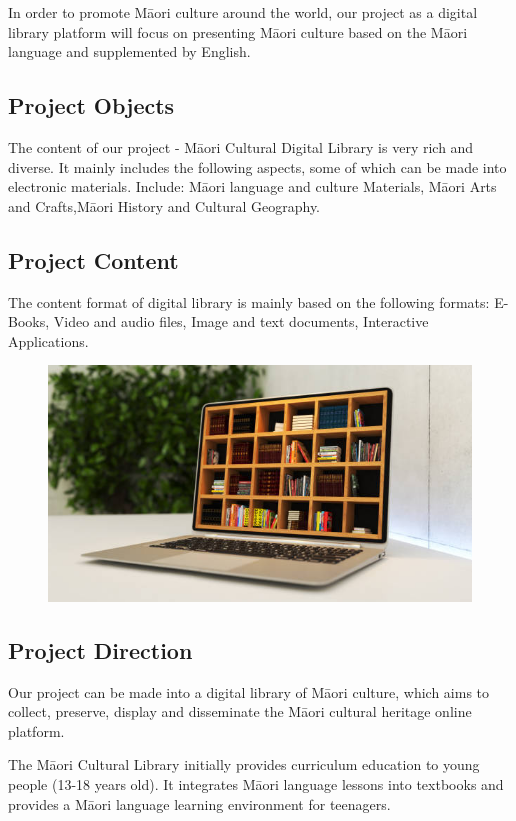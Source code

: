 In order to promote Māori culture around the world, our project as a digital library platform will focus on presenting Māori culture based on the Māori language and supplemented by English.

\subsection{Project Objects}
The content of our project - Māori Cultural Digital Library is very rich and diverse. It mainly includes the following aspects, some of which can be made into electronic materials. Include: Māori language and culture Materials, Māori Arts and Crafts,Māori History and Cultural Geography.

\subsection{Project Content}
The content format of digital library is mainly based on the following formats:
E-Books, Video and audio files, Image and text documents, Interactive Applications.

\begin{figure}[htbp]
  \centerline{\includegraphics[width=500pt]{images/M1-2-1.png}}
\end{figure}

\subsection{Project Direction}
Our project can be made into a digital library of Māori culture, which aims to collect, preserve, display and disseminate the Māori cultural heritage online platform.

The Māori Cultural Library initially provides curriculum education to young people (13-18 years old). It integrates Māori language lessons into textbooks and provides a Māori language learning environment for teenagers.

